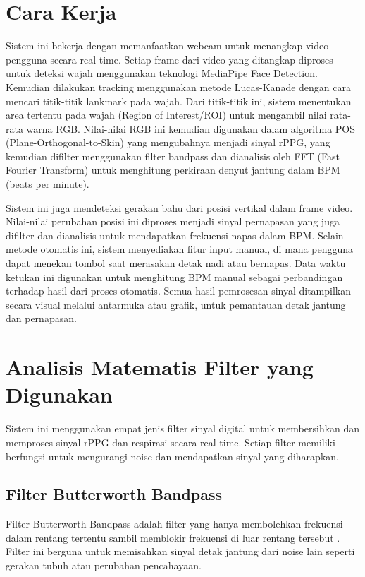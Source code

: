 \documentclass[11pt,a4paper]{article}
\begin{document}
\section{Cara Kerja}
    Sistem ini bekerja dengan memanfaatkan webcam untuk menangkap video pengguna secara real-time. Setiap frame dari video yang ditangkap diproses untuk deteksi wajah menggunakan teknologi MediaPipe Face Detection. Kemudian dilakukan tracking menggunakan metode Lucas-Kanade dengan cara mencari titik-titik lankmark pada wajah. Dari titik-titik ini, sistem menentukan area tertentu pada wajah (Region of Interest/ROI) untuk mengambil nilai rata-rata warna RGB. Nilai-nilai RGB ini kemudian digunakan dalam algoritma POS (Plane-Orthogonal-to-Skin) yang mengubahnya menjadi sinyal rPPG, yang kemudian difilter menggunakan filter bandpass dan dianalisis oleh FFT (Fast Fourier Transform) untuk menghitung perkiraan denyut jantung dalam BPM (beats per minute).

    Sistem ini juga mendeteksi gerakan bahu dari posisi vertikal dalam frame video. Nilai-nilai perubahan posisi ini diproses menjadi sinyal pernapasan yang juga difilter dan dianalisis untuk mendapatkan frekuensi napas dalam BPM. Selain metode otomatis ini, sistem menyediakan fitur input manual, di mana pengguna dapat menekan tombol saat merasakan detak nadi atau bernapas. Data waktu ketukan ini digunakan untuk menghitung BPM manual sebagai perbandingan terhadap hasil dari proses otomatis. Semua hasil pemrosesan sinyal ditampilkan secara visual melalui antarmuka atau grafik, untuk pemantauan detak jantung dan pernapasan.

\section{Analisis Matematis Filter yang Digunakan}
Sistem ini menggunakan empat jenis filter sinyal digital untuk membersihkan dan memproses sinyal rPPG dan respirasi secara real-time. Setiap filter memiliki berfungsi untuk mengurangi noise dan mendapatkan sinyal yang diharapkan.

\subsection{Filter Butterworth Bandpass}
Filter Butterworth Bandpass adalah filter yang hanya membolehkan frekuensi dalam rentang tertentu sambil memblokir frekuensi di luar rentang tersebut \cite{scipy2024}. Filter ini berguna untuk memisahkan sinyal detak jantung dari noise lain seperti gerakan tubuh atau perubahan pencahayaan.
\end{document}
